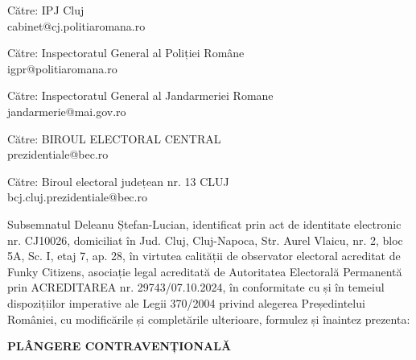 \documentclass[a4paper,12pt]{article}
\begin{document}
\begin{flushleft}
    \normalsize
    Către: IPJ Cluj\\
    cabinet@cj.politiaromana.ro\\
\end{flushleft}

\begin{flushleft}
    \normalsize
    Către: Inspectoratul General al Poliției Române\\
    igpr@politiaromana.ro\\
\end{flushleft}

\begin{flushleft}
    \normalsize
    Către: Inspectoratul General al Jandarmeriei Romane\\
    jandarmerie@mai.gov.ro\\
\end{flushleft}

\begin{flushleft}
    \normalsize
    Către: BIROUL ELECTORAL CENTRAL\\
    prezidentiale@bec.ro\\
\end{flushleft}

\begin{flushleft}
    \normalsize
    Către: Biroul electoral județean nr. 13 CLUJ\\
    bcj.cluj.prezidentiale@bec.ro\\
\end{flushleft}

\vspace{1cm}

Subsemnatul Deleanu Ștefan-Lucian, identificat prin act de identitate electronic nr. CJ10026, domiciliat în Jud. Cluj, Cluj-Napoca, Str. Aurel Vlaicu, nr. 2, bloc 5A, Sc. I, etaj 7, ap. 28, în virtutea calității de observator electoral acreditat de Funky Citizens, asociație legal acreditată de Autoritatea Electorală Permanentă prin ACREDITAREA nr. 29743/07.10.2024, în conformitate cu și în temeiul dispozițiilor imperative ale Legii 370/2004 privind alegerea Președintelui României, cu modificările și completările ulterioare, formulez și înaintez prezenta:

\vspace{0.5cm}
\begin{center}
\textbf{\Large PLÂNGERE CONTRAVENȚIONALĂ}
\end{center}
\vspace{0.5cm}
\end{document}
